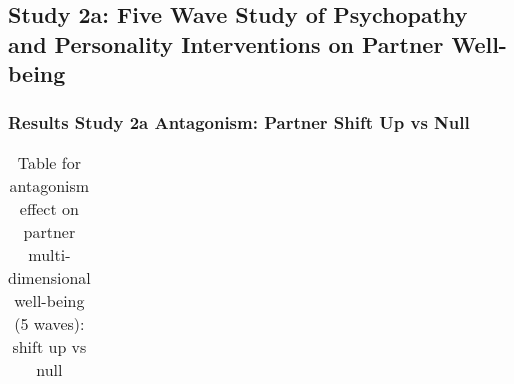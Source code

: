 \documentclass[
  singlecolumn]{article}
\begin{document}
\newpage{}

\subsection{Study 2a: Five Wave Study of Psychopathy and Personality
Interventions on Partner
Well-being}\label{study-2a-five-wave-study-of-psychopathy-and-personality-interventions-on-partner-well-being}

\subsubsection{Results Study 2a Antagonism: Partner Shift Up vs
Null}\label{results-study-2a-antagonism-partner-shift-up-vs-null}

\begin{longtable}[]{@{}
  >{\raggedright\arraybackslash}p{}
  >{\raggedleft\arraybackslash}p{}
  >{\raggedleft\arraybackslash}p{}
  >{\raggedleft\arraybackslash}p{}
  >{\raggedleft\arraybackslash}p{}
  >{\raggedleft\arraybackslash}p{}@{}}

\caption{\label{tbl-results-antagonism-partner-up-long}Table for
antagonism effect on partner multi-dimensional well-being (5 waves):
shift up vs null}

\tabularnewline


\end{longtable}
\end{document}
